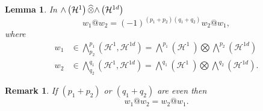 \documentclass[aps,preprint]{revtex4}%
\newtheorem{lemma}[theorem]{Lemma}
\newtheorem{remark}[theorem]{Remark}
\begin{document}
\begin{lemma}
In ${\huge \wedge}\left(  \mathcal{H}^{1}\right)  \widehat{\otimes
}{\huge \wedge}\left(  \mathcal{H}^{1d}\right)  $
\begin{equation}
w_{1}@w_{2}=\left(  -1\right)  ^{\left(  p_{1}+p_{2}\right)  \left(
q_{1}+q_{2}\right)  }w_{2}@w_{1},
\end{equation}
where
\begin{align}
w_{1}  &  \in%
{\textstyle\bigwedge\nolimits_{p_{2}}^{p_{1}}}
\left(  \mathcal{H}^{1},\mathcal{H}^{1d}\right)  =%
{\textstyle\bigwedge\nolimits^{p_{1}}}
\left(  \mathcal{H}^{1}\ \right)
{\textstyle\bigotimes}
{\textstyle\bigwedge\nolimits^{p_{2}}}
\left(  \mathcal{H}^{1d}\right) \\
w_{2}  &  \in%
{\textstyle\bigwedge\nolimits_{q_{2}}^{q_{1}}}
\left(  \mathcal{H}^{1},\mathcal{H}^{1d}\right)  =%
{\textstyle\bigwedge\nolimits^{q_{1}}}
\left(  \mathcal{H}^{1}\ \right)
{\textstyle\bigotimes}
{\textstyle\bigwedge\nolimits^{q_{2}}}
\left(  \mathcal{H}^{1d}\right)  .
\end{align}

\end{lemma}

\begin{remark}
If $\left(  p_{1}+p_{2}\right)  $ or $\left(  q_{1}+q_{2}\right)  $ are even
then
\begin{equation}
w_{1}@w_{2}=w_{2}@w_{1}.
\end{equation}

\end{remark}
\end{document}

